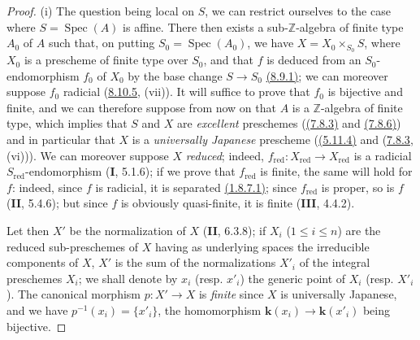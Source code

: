 \begin{proof}
\textup{(i)} The question being local on $S$, we can restrict ourselves to the case
where $S=\operatorname{Spec}(A)$ is affine. There then exists a
sub-$\mathbb Z$-algebra of finite type $A_0$ of $A$ such that, on putting
$S_0=\operatorname{Spec}(A_0)$, we have
$X=X_0\times_{S_0}S$, where $X_0$ is a prescheme of finite type over $S_0$,
and that $f$ is deduced from an $S_0$-endomorphism $f_0$ of $X_0$ by the
base change $S\to S_0$
{\hyperref[IV.8.9.1]{(8.9.1)}}; we can moreover suppose
$f_0$ radicial ({\hyperref[IV.8.10.5]{8.10.5}}, (vii)). It
will suffice to prove that $f_0$ is bijective and finite, and we can therefore
suppose from now on that $A$ is a $\mathbb Z$-algebra of finite type, which
implies that $S$ and $X$ are \emph{excellent} preschemes
({\hyperref[IV.7.8.3]{(7.8.3)}} and
{\hyperref[IV.7.8.6]{(7.8.6)}}) and in particular that $X$
is a \emph{universally Japanese} prescheme
({\hyperref[IV.5.11.4]{(5.11.4)}} and
({\hyperref[IV.7.8.3]{7.8.3}}, (vi))). We can moreover
suppose $X$ \emph{reduced}; indeed,
$f_{\mathrm{red}}:X_{\mathrm{red}}\to X_{\mathrm{red}}$ is a radicial
$S_{\mathrm{red}}$-endomorphism (\textbf{I}, 5.1.6); if we prove that
$f_{\mathrm{red}}$ is finite, the same will hold for $f$: indeed,
since $f$ is radicial, it is separated
{\hyperref[IV.1.8.7.1]{(1.8.7.1)}}; since
$f_{\mathrm{red}}$ is proper, so is $f$ (\textbf{II}, 5.4.6);
but since $f$ is obviously quasi-finite, it is finite (\textbf{III}, 4.4.2).

Let then $X'$ be the normalization of $X$ (\textbf{II}, 6.3.8); if $X_i$
($1\leq i\leq n$) are the reduced sub-preschemes of $X$ having as
underlying spaces the irreducible components of $X$, $X'$ is the
sum of the normalizations $X'_i$ of the integral preschemes $X_i$; we
shall denote by $x_i$ (resp. $x'_i$) the generic point of $X_i$
(resp. $X'_i$). The canonical morphism $p:X'\to X$ is \emph{finite} since
$X$ is universally Japanese, and we have
$p^{-1}(x_i)=\{x'_i\}$, the homomorphism $\boldsymbol{k}(x_i)\to\boldsymbol{k}(x'_i)$ being
bijective.


\end{proof}
